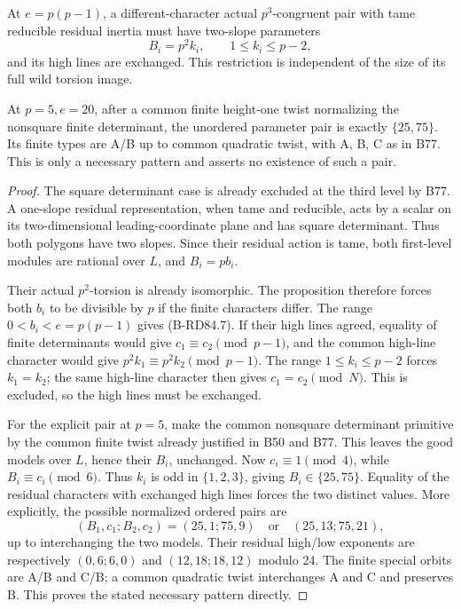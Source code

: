 \begin{corollary}
\label{cor:B-RD84-first-wild}
At \(e=p(p-1)\), a different-character actual
\(p^3\)-congruent pair with tame reducible residual inertia
must have two-slope parameters
\[
 B_i=p^2k_i,\qquad1\le k_i\le p-2,                  \tag{B-RD84.7}
\]
and its high lines are exchanged. This restriction is
independent of the size of its full wild torsion image.

At \(p=5,e=20\), after a common finite height-one twist
normalizing the nonsquare finite determinant, the unordered
parameter pair is exactly \(\{25,75\}\). Its finite
types are A/B up to common quadratic twist, with A, B,
C as in B77. This is only a necessary pattern and asserts
no existence of such a pair.
\end{corollary}
\begin{proof}
The square determinant case is already excluded at the
third level by B77. A one-slope residual representation,
when tame and reducible, acts by a scalar on its
two-dimensional leading-coordinate plane and has square
determinant. Thus both polygons have two slopes. Since
their residual action is tame, both first-level modules
are rational over \(L\), and \(B_i=pb_i\).

Their actual \(p^2\)-torsion is already isomorphic.
The proposition therefore forces both \(b_i\) to be
divisible by \(p\) if the finite characters differ.
The range \(0<b_i<e=p(p-1)\) gives (B-RD84.7).
If their high lines agreed, equality of finite determinants
would give \(c_1\equiv c_2\pmod{p-1}\), and the common
high-line character would give
\(p^2k_1\equiv p^2k_2\pmod{p-1}\). The range
\(1\le k_i\le p-2\) forces \(k_1=k_2\); the same
high-line character then gives \(c_1=c_2\pmod N\).
This is excluded, so the high lines must be exchanged.

For the explicit pair at \(p=5\), make the common
nonsquare determinant primitive by the common finite
twist already justified in B50 and B77. This leaves the
good models over \(L\), hence their \(B_i\), unchanged.
Now \(c_i\equiv1\pmod4\), while
\(B_i\equiv c_i\pmod6\). Thus \(k_i\) is odd in
\(\{1,2,3\}\), giving \(B_i\in\{25,75\}\).
Equality of the residual characters with exchanged high
lines forces the two distinct values. More explicitly,
the possible normalized ordered pairs are
\[
 (B_1,c_1;B_2,c_2)=(25,1;75,9)
             \quad\text{or}\quad(25,13;75,21),         \tag{B-RD84.8}
\]
up to interchanging the two models. Their residual
high/low exponents are respectively \((0,6;6,0)\)
and \((12,18;18,12)\) modulo 24. The finite special
orbits are A/B and C/B; a common quadratic twist
interchanges A and C and preserves B. This proves the
stated necessary pattern directly.
\end{proof}

